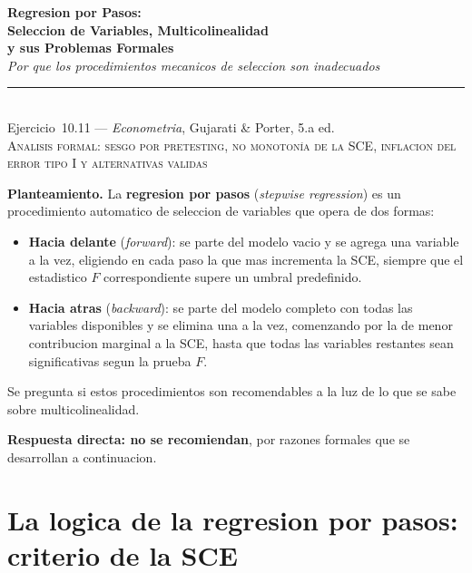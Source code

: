 \documentclass[12pt, letterpaper]{article}
\theoremstyle{remark}
\begin{document}
\begin{center}
  {\LARGE\bfseries Regresion por Pasos:}\\[6pt]
  {\LARGE\bfseries Seleccion de Variables, Multicolinealidad}\\[6pt]
  {\LARGE\bfseries y sus Problemas Formales}\\[12pt]
  {\large\itshape Por que los procedimientos mecanicos de seleccion son inadecuados}\\[14pt]
  \rule{0.55\linewidth}{0.6pt}\\[8pt]
  {\normalsize Ejercicio~10.11 --- \textit{Econometria}, Gujarati \& Porter, 5.a ed.}\\[4pt]
  {\small\textsc{Analisis formal: sesgo por pretesting, no monotonía de la SCE,
  inflacion del error tipo I y alternativas validas}}
\end{center}

\vspace{10pt}

\noindent\textbf{Planteamiento.}\quad
La \textbf{regresion por pasos} (\textit{stepwise regression}) es un
procedimiento automatico de seleccion de variables que opera de dos formas:

\begin{itemize}[leftmargin=1.6em, itemsep=4pt]
  \item \textbf{Hacia delante} (\textit{forward}): se parte del modelo vacio
    y se agrega una variable a la vez, eligiendo en cada paso la que mas
    incrementa la SCE, siempre que el estadistico $F$ correspondiente supere
    un umbral predefinido.
  \item \textbf{Hacia atras} (\textit{backward}): se parte del modelo completo
    con todas las variables disponibles y se elimina una a la vez, comenzando
    por la de menor contribucion marginal a la SCE, hasta que todas las
    variables restantes sean significativas segun la prueba $F$.
\end{itemize}

\noindent Se pregunta si estos procedimientos son recomendables a la luz
de lo que se sabe sobre multicolinealidad.

\noindent\textbf{Respuesta directa: no se recomiendan}, por razones formales
que se desarrollan a continuacion.

\section{La logica de la regresion por pasos: criterio de la SCE}
\end{document}
